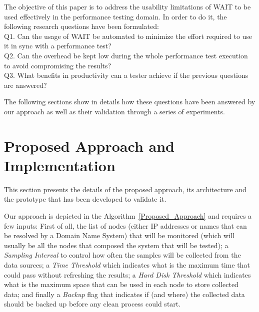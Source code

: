 \documentclass[runningheads,a4paper]{llncs}
\begin{document}
The objective of this paper is to address the usability limitations of WAIT to
be used effectively in the performance testing domain. In order to do it, the
following research questions have been formulated:
\\Q1. Can the usage of WAIT be automated to minimize the effort
required to use it in sync with a performance test?
\\Q2. Can the overhead be kept low during the whole performance test
execution to avoid compromising the results? 
\\Q3. What benefits in productivity can a tester achieve if the previous
questions are answered?

The following sections show in details how these questions have been answered by
our approach as well as their validation through a series of experiments.


\section{Proposed Approach and Implementation}

This section presents the details of the proposed approach, its architecture
and the prototype that has been developed to validate it.

Our approach is depicted in the Algorithm~\ref{Proposed_Approach} and requires
a few inputs: First of all, the list of nodes (either IP addresses or names that
can be resolved by a Domain Name System) that will be monitored (which
will usually be all the nodes that composed the system that will be tested); a
\emph{Sampling Interval} to control how often the samples will be collected
from the data sources; a \emph{Time Threshold} which indicates what is the
maximum time that could pass without refreshing the results; a \emph{Hard Disk
Threshold} which indicates what is the maximum space that can be used in each
node to store collected data; and finally a \emph{Backup} flag that indicates if
(and where) the collected data should be backed up before any clean process could start.
\end{document}
